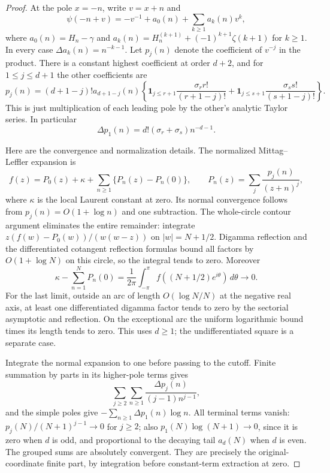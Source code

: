 \begin{proof}
At the pole $x=-n$, write $v=x+n$ and
\[
 \psi(-n+v)=-v^{-1}+a_0(n)+\sum_{k\ge1}a_k(n)v^k,
\]
where $a_0(n)=H_n-\gamma$ and
$a_k(n)=H_n^{(k+1)}+(-1)^{k+1}\zeta(k+1)$ for $k\ge1$.
In every case $\Delta a_k(n)=n^{-k-1}$.
Let $p_j(n)$ denote the coefficient of $v^{-j}$ in the product.
There is a constant highest coefficient at order $d+2$, and for
$1\le j\le d+1$ the other coefficients are
\begin{equation}\label{dq:bilinearpoles}
 p_j(n)=(d+1-j)!a_{d+1-j}(n)
 \left\{\mathbf1_{j\le r+1}\frac{\sigma_r r!}{(r+1-j)!}
       +\mathbf1_{j\le s+1}\frac{\sigma_s s!}{(s+1-j)!}\right\}.
\end{equation}
This is just multiplication of each leading pole by the other's
analytic Taylor series. In particular
\[
 \Delta p_1(n)=d!(\sigma_r+\sigma_s)n^{-d-1}.
\]

Here are the convergence and normalization details. The normalized
Mittag--Leffler expansion is
\[
 f(z)=P_0(z)+\kappa+
           \sum_{n\ge1}\{P_n(z)-P_n(0)\},\qquad
 P_n(z)=\sum_j\frac{p_j(n)}{(z+n)^j},
\]
where $\kappa$ is the local Laurent constant at zero. Its normal
convergence follows from $p_j(n)=O(1+\log n)$ and one subtraction.
The whole-circle contour argument eliminates the entire remainder:
integrate $z(f(w)-P_0(w))/(w(w-z))$ on $|w|=N+1/2$.
Digamma reflection and the differentiated cotangent reflection formulas
bound all factors by $O(1+\log N)$ on this circle, so the integral
tends to zero. Moreover
\[
 \kappa-\sum_{n=1}^NP_n(0)
       =\frac1{2\pi}\int_{-\pi}^{\pi}f((N+1/2)e^{i\theta})\,d\theta
       \longrightarrow0.
\]
For the last limit, outside an arc of length $O(\log N/N)$ at the
negative real axis, at least one differentiated digamma factor tends
to zero by the sectorial asymptotic and reflection. On the exceptional
arc the uniform logarithmic bound times its length tends to zero.
This uses $d\ge1$; the undifferentiated square is a separate case.

Integrate the normal expansion to one before passing to the cutoff.
Finite summation by parts in its higher-pole terms gives
\[
 \sum_{j\ge2}\sum_{n\ge1}
              \frac{\Delta p_j(n)}{(j-1)n^{j-1}},
\]
and the simple poles give $-\sum_{n\ge1}\Delta p_1(n)\log n$.
All terminal terms vanish: $p_j(N)/(N+1)^{j-1}\to0$ for $j\ge2$;
also $p_1(N)\log(N+1)\to0$, since it is zero when $d$ is odd,
and proportional to the decaying tail $a_d(N)$ when $d$ is even.
The grouped sums are absolutely convergent. They are precisely the
original-coordinate finite part, by integration before constant-term
extraction at zero.


\end{proof}
